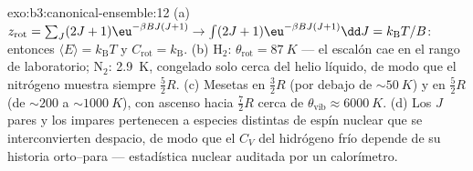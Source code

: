 \begin{solution}{exo:b3:canonical-ensemble:12}
(a) $z_{\text{rot}} = \sum_J(2J+1)\eu^{-\beta BJ(J+1)}
\to \int(2J+1)\eu^{-\beta BJ(J+1)}\dd J = k_{\text{B}}T/B$: entonces
$\langle E\rangle = k_{\text{B}}T$ y $C_{\text{rot}} =
k_{\text{B}}$. (b) H$_2$: $\theta_{\text{rot}} = \qty{87}{K}$ ---
el escalón cae en el rango de laboratorio; N$_2$: \qty{2.9}{K},
congelado solo cerca del helio líquido, de modo que el nitrógeno muestra
siempre $\tfrac52 R$. (c) Mesetas en $\tfrac32 R$ (por debajo de
$\sim\qty{50}{K}$) y en $\tfrac52 R$ (de $\sim200$ a $\sim\qty{1000}{K}$),
con ascenso hacia $\tfrac72 R$ cerca de $\theta_{\text{vib}} \approx
\qty{6000}{K}$. (d) Los $J$ pares y los impares pertenecen a especies
distintas de espín nuclear que se interconvierten despacio, de modo que el
$C_V$ del hidrógeno frío depende de su historia orto--para --- estadística
nuclear auditada por un calorímetro.
\end{solution}

